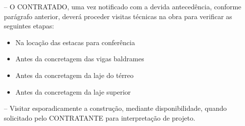 \documentclass[11pt,a4paper]{article}
\begin{document}
 – O CONTRATADO, uma vez notificado com a devida antecedência, conforme parágrafo anterior, deverá proceder visitas técnicas na obra para verificar as seguintes etapas:
\begin{itemize}
    \item Na locação das estacas para conferência
    \item Antes da concretagem das vigas baldrames
    \item Antes da concretagem da laje do térreo
    \item Antes da concretagem da laje superior
\end{itemize}

\vspace{0.3cm}
 – Visitar esporadicamente a construção, mediante disponibilidade, quando solicitado pelo CONTRATANTE para interpretação de projeto.
\end{document}
